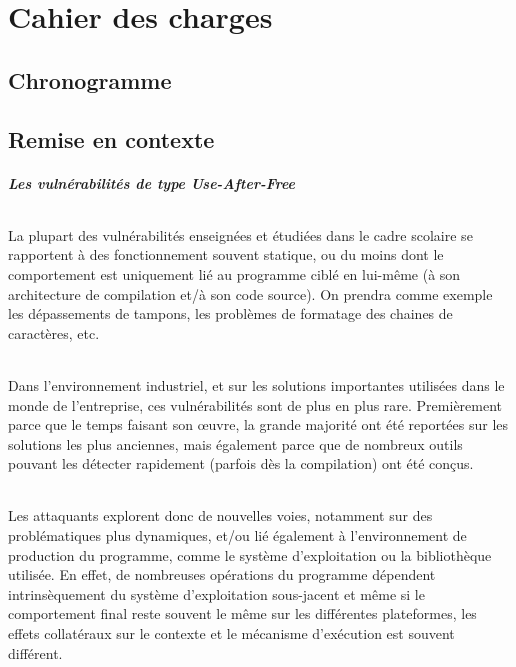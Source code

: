 \chapter{Cahier des charges}
\section*{Chronogramme}
\begin{center}
\end{center}
\section{Remise en contexte}
\paragraph{Les vulnérabilités de type Use-After-Free}
\subparagraph{}
La plupart des vulnérabilités enseignées et étudiées dans le cadre scolaire
se rapportent à des fonctionnement souvent statique, ou du moins dont le comportement
est uniquement lié au programme ciblé en lui-même (à son architecture de compilation et/à
son code source). On prendra comme exemple les dépassements de tampons, les problèmes de
formatage des chaines de caractères, etc.\subparagraph{}
Dans l'environnement industriel, et sur les solutions importantes utilisées dans le monde
de l'entreprise, ces vulnérabilités sont de plus en plus rare. Premièrement parce que le temps
faisant son œuvre, la grande majorité ont été reportées sur les solutions les plus anciennes,
mais également parce que de nombreux outils pouvant les détecter rapidement (parfois dès la compilation)
ont été conçus.\subparagraph{}
Les attaquants explorent donc de nouvelles voies, notamment sur des problématiques plus dynamiques, et/ou
lié également à l'environnement de production du programme, comme le système d'exploitation ou la bibliothèque utilisée.
En effet, de nombreuses opérations du programme dépendent intrinsèquement du système d'exploitation sous-jacent et
même si le comportement final reste souvent le même sur les différentes plateformes, les effets collatéraux
sur le contexte et le mécanisme d'exécution est souvent différent.\subparagraph{}

